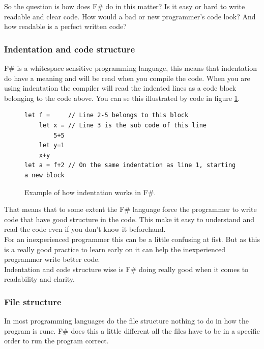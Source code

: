 \documentclass[12pt, a4paper]{article}
\begin{document}
So the question is how does F\# do in this matter? Is it easy or hard to write readable and clear code. How would a bad or new programmer's code look? And how readable is a perfect written code?

\newpage
\subsubsection{Indentation and code structure}
F\# is a whitespace sensitive programming language, this means that indentation do have a meaning and will be read when you compile the code. When you are using indentation the compiler will read the indented lines as a code block belonging to the code above. You can se this illustrated by code in figure \ref{fig:indentationExample}.

\begin{figure}[!h]
	\begin{lstlisting}
let f = 	// Line 2-5 belongs to this block
	let x = // Line 3 is the sub code of this line
		5+5	
	let y=1
  	x+y
let a = f+2	// On the same indentation as line 1, starting a new block
	\end{lstlisting}
	\caption{Example of how indentation works in F\#.}
	\label{fig:indentationExample}
\end{figure}

That means that to some extent the F\# language force the programmer to write code that have good structure in the code. This make it easy to understand and read the code even if you don't know it beforehand.\\

For an inexperienced programmer this can be a little confusing at fist. But as this is a really good practice to learn early on it can help the inexperienced programmer write better code.\\

Indentation and code structure wise is F\# doing really good when it comes to readability and clarity.

\newpage
\subsubsection{File structure}

In most programming languages do the file structure nothing to do in how the program is rune. F\# does this a little different all the files have to be in a specific order to run the program correct.\\
\end{document}
